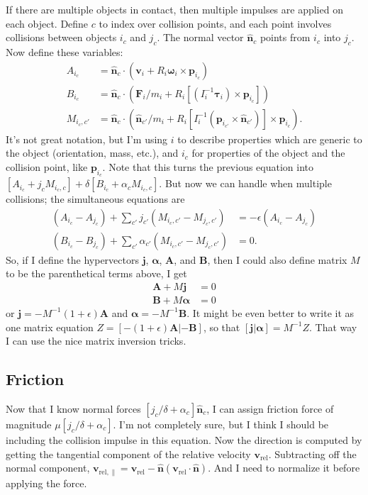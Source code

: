 \documentclass[11pt,twocolumn]{article}
\newcommand{\unit}[1]{\hat{\bm {#1}}}
\newcommand{\parens}[1]{\left(#1\right)}
\begin{document}
    If there are multiple objects in contact, then multiple impulses are applied on each object. Define $c$ to index over collision points, and each point involves collisions between objects $i_c$ and $j_c$. The normal vector $\unit n_c$ points from $i_c$ into $j_c$. Now define these variables:
    \begin{align}
      A_{i_c} &= \unit n_c \cdot \parens{\bm v_i + R_i \bm \omega_i \times \bm p_{i_c}}\\
      B_{i_c} &= \unit n_c \cdot \parens{\bm F_i/m_i + R_i [(I_i^{-1} \bm \tau_i) \times \bm p_{i_c}]}\\
      M_{i_c,c'} &= \unit n_c \cdot \parens{\unit n_{c'}/m_i + R_i [I_i^{-1} ( \bm p_{i_{c'}} \times \unit n_{c'})] \times \bm p_{i_c}}.
    \end{align}
    It's not great notation, but I'm using $i$ to describe properties which are generic to the object (orientation, mass, etc.), and $i_c$ for properties of the object and the collision point, like $\bm p_{i_c}$. Note that this turns the previous equation into $[A_{i_c} + j_c M_{i_c,c}] + \delta[B_{i_c} + \alpha_c M_{i_c,c}]$. But now we can handle when multiple collisions; the simultaneous equations are
    \begin{align}
      (A_{i_c}-A_{j_c}) + \sum_{c'}j_{c'}(M_{i_c,c'}-M_{j_c,c'}) &= -\epsilon (A_{i_c}-A_{j_c})\\
      (B_{i_c}-B_{j_c}) + \sum_{c'}\alpha_{c'}(M_{i_c,c'}-M_{j_c,c'}) &= 0.
    \end{align}
    So, if I define the hypervectors $\bm j$, $\bm \alpha$, $\bm A$, and $\bm B$, then I could also define matrix $M$ to be the parenthetical terms above, I get
    \begin{align}
      [1+\epsilon]\bm A + M \bm j &= 0\\
      \bm B + M \bm \alpha &= 0
    \end{align}
    or $\bm j = -M^{-1} (1+\epsilon) \bm A$ and $\bm \alpha = -M^{-1} \bm B$. It might be even better to write it as one matrix equation $Z = [-(1+\epsilon) \bm A | -\bm B]$, so that $[\bm j | \bm \alpha] = M^{-1} Z$. That way I can use the nice matrix inversion tricks.

    \subsection{Friction}
    Now that I know normal forces $[j_c/\delta + \alpha_c]\unit n_c$, I can assign friction force of magnitude $\mu [j_c / \delta + \alpha_c]$. I'm not completely sure, but I think I should be including the collision impulse in this equation. Now the direction is computed by getting the tangential component of the relative velocity $\bm v_\mathrm{rel}$. Subtracting off the normal component, $\bm v_{\mathrm{rel},\parallel} = \bm v_\mathrm{rel} - \unit n (\bm v_\mathrm{rel} \cdot \unit n)$. And I need to normalize it before applying the force.
\end{document}
